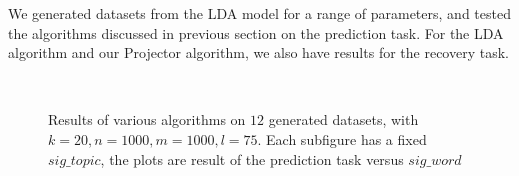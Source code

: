 We generated datasets from the LDA model for a range of parameters,
and tested the algorithms discussed in previous section on the
prediction task. For the LDA algorithm and our Projector algorithm, we also have results for the recovery task.  


\begin{figure}
     \begin{center}

        \\ 

    \end{center}
    \caption{Results of various algorithms on $12$ generated datasets, with $k=20, n=1000,m=1000,l=75$. Each subfigure has a fixed $sig\_topic$, the plots are result of the prediction task versus $sig\_word$}
   \label{fig:predictResult}
\end{figure}

